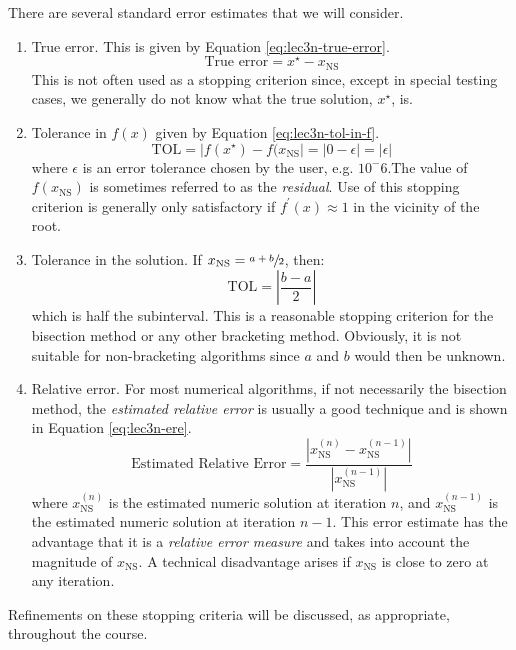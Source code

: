 \vspace{0.25cm}

\noindent There are several standard error estimates that we will consider.

\begin{enumerate}
\item True error.  This is given by Equation \ref{eq:lec3n-true-error}.
\begin{equation}
\text{True error} = x^{\star} - x_{\text{NS}}
\label{eq:lec3n-true-error}
\end{equation}
This is not often used as a stopping criterion since, except in special testing cases, we generally do not know what the true solution, $x^{\star}$, is.

\item Tolerance in $f(x)$ given by Equation \ref{eq:lec3n-tol-in-f}.
\begin{equation}
\text{TOL} = \left| f(x^{\star}) - f(x_{\text{NS}}\right| = \left|0-\epsilon \right| = \left|\epsilon\right|
\label{eq:lec3n-tol-in-f}
\end{equation}
where $\epsilon$ is an error tolerance chosen by the user, e.g. $10^-6$.The value of $f(x_{\text{NS}})$ is sometimes referred to as the \emph{residual}.  Use of this stopping criterion is generally only satisfactory if $f^{\prime}(x) \approx 1$ in the vicinity of the root.

\item Tolerance in the solution. If $x_{\text{NS}} = \sfrac{a+b}{2}$, then:
\begin{equation*}
\text{TOL} = \left|\frac{b-a}{2} \right|
\end{equation*}
which is half the subinterval.  This is a reasonable stopping criterion for the bisection method or any other bracketing method.  Obviously, it is not suitable for non-bracketing algorithms since $a$ and $b$ would then be unknown.  

\item Relative error.  For most numerical algorithms, if not necessarily the bisection method, the \emph{estimated relative error} is usually a good technique and is shown in Equation \ref{eq:lec3n-ere}.
\begin{equation}
\text{Estimated Relative Error} = \frac{\left|x_{\text{NS}}^{(n)} - x_{\text{NS}}^{(n-1)}\right|}{\left|x_{\text{NS}}^{(n-1)}\right|} 
\label{eq:lec3n-ere}
\end{equation}
where $x_{\text{NS}}^{(n)}$ is the estimated numeric solution at iteration $n$, and $x_{\text{NS}}^{(n-1)}$ is the estimated numeric solution at iteration $n-1$.  This error estimate has the advantage that it is a \emph{relative error measure} and takes into account the magnitude of $x_{\text{NS}}$.  A technical disadvantage arises if $x_{\text{NS}}$ is close to zero at any iteration.  
\end{enumerate}
Refinements on these stopping criteria will be discussed, as appropriate, throughout the course.

